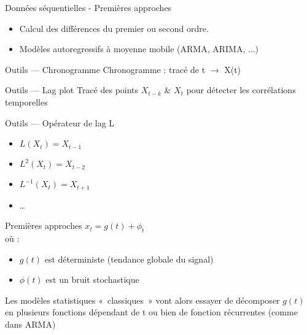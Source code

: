 \begin{frame}{Données séquentielles - Premières approches }
  \begin{itemize}[<+->]
  \item Calcul des différences du premier ou second ordre.
  \item Modèles autoregressifs à moyenne mobile (ARMA, ARIMA, ...)
  \end{itemize}
\end{frame}

\begin{frame}{Outils --- Chronogramme}
  Chronogramme : tracé de t $\rightarrow$ X(t) 

\end{frame}

\begin{frame}{Outils --- Lag plot}
  Tracé des points $X_{t - k}$ \& $X_t$ pour détecter les corrélations temporelles

  \begin{minipage}[l]{0.499\linewidth}
  \end{minipage}\hfill
  \begin{minipage}[l]{0.499\linewidth}
  \end{minipage}\hfill
\end{frame}

\begin{frame}{Outils --- Opérateur de lag L}
  \begin{itemize}
  \item $L(X_{t}) = X_{t-1}$
  \item $L^2(X_{t}) = X_{t-2}$
  \item $L^{-1}(X_{t}) = X_{t+1}$
  \item …
  \end{itemize}
\end{frame}

\begin{frame}{Premières approches}
  $x_t=g(t)+\phi_t$ \\
  où :
  \begin{itemize}
  \item $g(t)$ est déterministe (tendance globale du signal)
  \item $\phi(t)$ est un bruit stochastique
  \end{itemize}
  Les modèles statistiques «~classiques~» vont alors essayer de décomposer $g(t)$ en plusieurs fonctions dépendant de t ou bien de fonction récurrentes (comme dans ARMA)
\end{frame}

